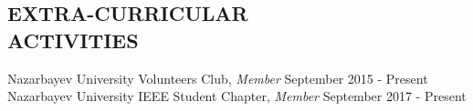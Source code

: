 \documentclass[margin, 10pt]{res} %
\begin{document}
\begin{resume}
\section{EXTRA-CURRICULAR \\ ACTIVITIES} 

Nazarbayev University Volunteers Club, {\sl Member} \hfill September 2015 - Present\\
Nazarbayev University IEEE Student Chapter, {\sl Member} \hfill September 2017 - Present \\
 


\end{resume}
\end{document}
